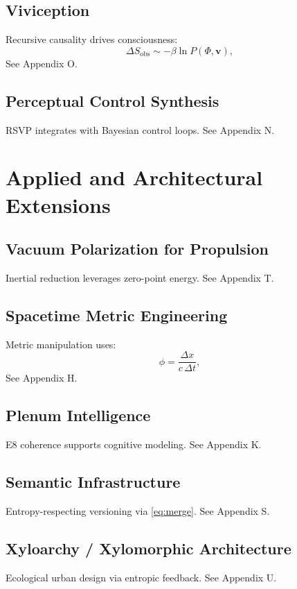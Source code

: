 \documentclass[12pt]{report}
\newcommand{\PhiRSVP}{\Phi}
\newcommand{\vRSVP}{\mathbf{v}}
\newcommand{\SRSVP}{S}
\begin{document}
\chapter{Viviception}
Recursive causality drives consciousness:
\begin{equation}
\Delta \SRSVP_{\text{obs}} \sim -\beta \ln P(\PhiRSVP, \vRSVP), \label{eq:viviception}
\end{equation}
See Appendix O.

\chapter{Perceptual Control Synthesis}
RSVP integrates with Bayesian control loops. See Appendix N.

\part{Applied and Architectural Extensions}

\chapter{Vacuum Polarization for Propulsion}
Inertial reduction leverages zero-point energy. See Appendix T.

\chapter{Spacetime Metric Engineering}
Metric manipulation uses:
\begin{equation}
\phi = \frac{\Delta x}{c \, \Delta t}, \label{eq:photon}
\end{equation}
See Appendix H.

\chapter{Plenum Intelligence}
E8 coherence supports cognitive modeling. See Appendix K.

\chapter{Semantic Infrastructure}
Entropy-respecting versioning via \eqref{eq:merge}. See Appendix S.

\chapter{Xyloarchy / Xylomorphic Architecture}
Ecological urban design via entropic feedback. See Appendix U.
\end{document}
